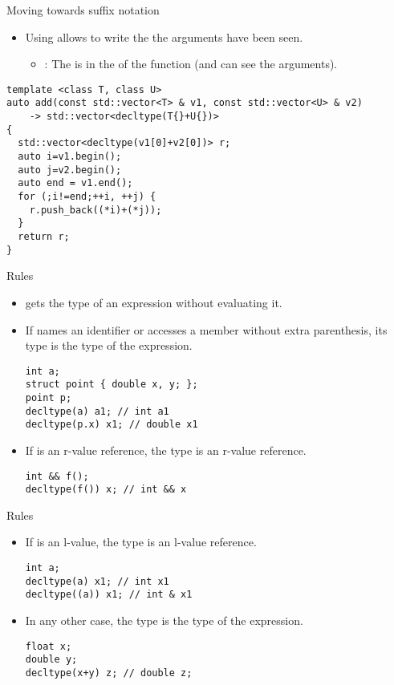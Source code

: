 \begin{frame}[t,fragile]{Moving towards suffix notation}
  \begin{itemize}
    \item Using  allows to write the 
           the arguments have been seen.
      \begin{itemize}
        \item {}: 
              The  is in the 
              of the function (and can see the arguments).
      \end{itemize}
  \end{itemize}
\pause
\begin{lstlisting}
template <class T, class U>
auto add(const std::vector<T> & v1, const std::vector<U> & v2) 
    -> std::vector<decltype(T{}+U{})>
{
  std::vector<decltype(v1[0]+v2[0])> r;
  auto i=v1.begin();
  auto j=v2.begin();
  auto end = v1.end();
  for (;i!=end;++i, ++j) {
    r.push_back((*i)+(*j));
  }
  return r;
}
\end{lstlisting}
\end{frame}

\begin{frame}[t,fragile]{Rules}
  \begin{itemize}
    \item {} 
          gets the type of an expression without evaluating it.
    \item \pause If  names an identifier or accesses a member without extra parenthesis,
          its type is the type of the expression.
\begin{lstlisting}
int a;
struct point { double x, y; };
point p;
decltype(a) a1; // int a1
decltype(p.x) x1; // double x1
\end{lstlisting}
    \item \pause If  is an r-value reference, 
          the type is an r-value reference.
\begin{lstlisting}
int && f();
decltype(f()) x; // int && x
\end{lstlisting}
  \end{itemize}
\end{frame}

\begin{frame}[t,fragile]{Rules}
  \begin{itemize}
    \item If  is an l-value, the type is an l-value reference.
\begin{lstlisting}
int a;
decltype(a) x1; // int x1
decltype((a)) x1; // int & x1
\end{lstlisting}
    \item \pause In any other case, the type is the type of the expression.
\begin{lstlisting}
float x;
double y;
decltype(x+y) z; // double z;
\end{lstlisting}
  \end{itemize}
\end{frame}

